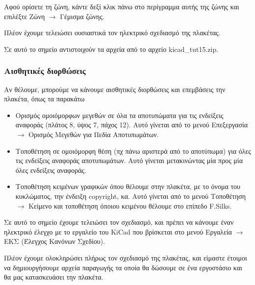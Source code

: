 \documentclass[a4paper]{article}
\begin{document}
Αφού ορίσετε τη ζώνη, κάντε δεξί κλικ πάνω στο περίγραμμα αυτής της ζώνης και επιλέξτε Ζώνη $\rightarrow$ Γέμισμα ζώνης.

Πλέον έχουμε τελειώσει ουσιαστικά τον ηλεκτρικό σχεδιασμό της πλακέτας.

Σε αυτό το σημείο αντιστοιχούν τα αρχεία από το αρχείο kicad\_tut15.zip.

\subsubsection{Αισθητικές διορθώσεις}

Αν θέλουμε, μπορούμε να κάνουμε αισθητικές διορθώσεις και επεμβάσεις την πλακέτα, όπως τα παρακάτω
\begin{itemize}
    \item Ορισμός ομοιόμορφων μεγεθών σε όλα τα αποτυπώματα για τις ενδείξεις αναφοράς (πλάτος 8, ύψος 7, πάχος 12). Αυτό γίνεται από το μενού Επεξεργασία $\rightarrow$ Ορισμός Μεγεθών για Πεδία Αποτυπωμάτων.
    \item Τοποθέτηση σε ομοιόμορφη θέση (πχ πάνω αριστερά από το αποτύπωμα) για όλες τις ενδείξεις αναφοράς αποτυπωμάτων. Αυτό γίνεται μετακινώντας μία προς μία όλες ενδείξεις αναφοράς.
    \item Τοποθέτηση κειμένων γραφικών όπου θέλουμε στην πλακέτα, με το όνομα του κυκλώματος, την ένδειξη copyright, κα. Αυτό γίνεται από το μενού Τοποθέτηση $\rightarrow$ Κείμενο και τοποθέτηση όποιου κειμένου θέλουμε στο επίπεδο F.Silks.
\end{itemize}

\begin{figure}
  \begin{center}
    \label{fig:kicad-main}
  \end{center}
\end{figure}

Σε αυτό το σημείο έχουμε τελειώσει τον σχεδιασμό, και πρέπει να κάνουμε έναν ηλεκτρικό έλεγχο με το εργαλείο του \textenglish{KiCad} που βρίσκεται στο μενού Εργαλεία $\rightarrow$ ΕΚΣ (Έλεγχος Κανόνων Σχεδίου).

Πλέον έχουμε ολοκληρώσει πλήρως τον σχεδιασμό της πλακέτας, και είμαστε έτοιμοι να δημιουργήσουμε αρχεία παραγωγής τα οποία θα δώσουμε σε ένα εργοστάσιο και θα μας κατασκευάσει την πλακέτα.
\end{document}
